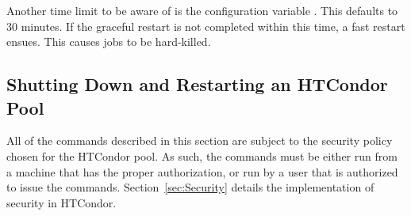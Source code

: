 Another time limit to be aware of is the configuration variable 
. 
This defaults to 30 minutes. 
If the graceful restart is not completed within this time, 
a fast restart ensues. 
This causes jobs to be hard-killed. 

\subsection{\label{sec:Pool-Shutdown-and-Restart}
Shutting Down and Restarting an HTCondor Pool}

All of the commands described in this section are subject to the
security policy chosen for the HTCondor pool.
As such, the commands must be either run from a
machine that has the proper authorization, 
or run by a user that is authorized to issue the commands.
Section~\ref{sec:Security} details the implementation of 
security in HTCondor.


